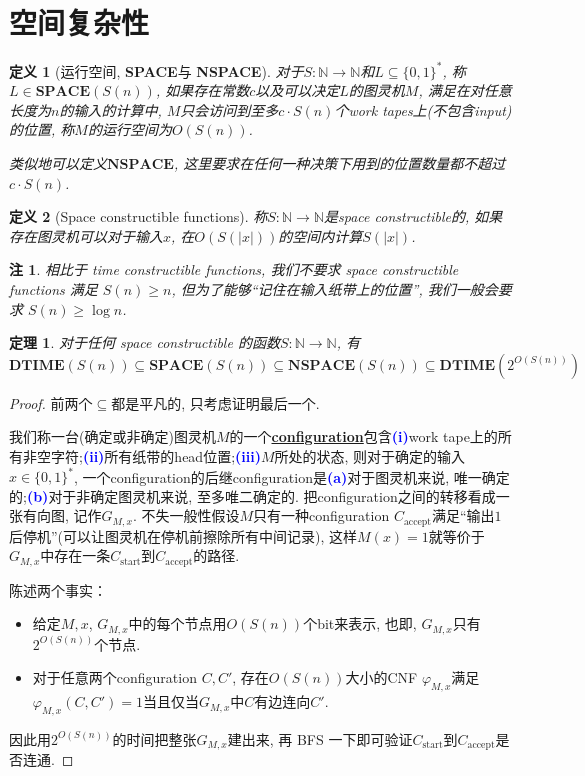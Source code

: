 \documentclass[8pt]{article}
\theoremstyle{compact}
\newtheorem{theorem}{定理}
\newtheorem{definition}{定义}
\newtheorem{remark}{注}
\def\obj#1{\textbf{\uline{#1}}}
\def\num#1{\textnormal{\textbf{\mbox{\textcolor{blue}{(#1)}}}}}
\def\ge{\geqslant}
\def\DTIME{\textbf{DTIME}}
\def\SPACE{\textbf{SPACE}}
\def\NSPACE{\textbf{NSPACE}}
\begin{document}
\section{空间复杂性}
\begin{definition}[运行空间, \SPACE 与 \NSPACE]
	对于$S: \mathbb N \to \mathbb N$和$L \subseteq \{0, 1\}^*$, 称$L \in \SPACE(S(n))$, 如果存在常数$c$以及可以决定$L$的图灵机$M$, 满足在对任意长度为$n$的输入的计算中, $M$只会访问到至多$c \cdot S(n)$个work tapes上(不包含input)的位置, 称$M$的运行空间为$O(S(n))$. 

	类似地可以定义$\NSPACE$, 这里要求在任何一种决策下用到的位置数量都不超过$c \cdot S(n)$. 
\end{definition}
\begin{definition}[Space constructible functions]
	称$S: \mathbb N \to \mathbb N$是space constructible的, 如果存在图灵机可以对于输入$x$, 在$O(S(|x|))$的空间内计算$S(|x|)$. 
\end{definition}
\begin{remark}
	相比于 time constructible functions, 我们不要求 space constructible functions 满足 $S(n) \ge n$, 但为了能够“记住在输入纸带上的位置”, 我们一般会要求 $S(n) \ge \log n$. 
\end{remark}
\begin{theorem}
	对于任何 space constructible 的函数$S: \mathbb N \to \mathbb N$, 有
	$$\DTIME(S(n)) \subseteq \SPACE(S(n)) \subseteq \NSPACE(S(n)) \subseteq \DTIME(2^{O(S(n))})$$
	\label{time_and_space}
\end{theorem}
\begin{proof}
	前两个$\subseteq$都是平凡的, 只考虑证明最后一个. 

	我们称一台(确定或非确定)图灵机$M$的一个\obj{configuration}包含\num{i}work tape上的所有非空字符;\num{ii}所有纸带的head位置;\num{iii}$M$所处的状态, 则对于确定的输入$x \in \{0, 1\}^*$, 一个configuration的后继configuration是\num{a}对于图灵机来说, 唯一确定的;\num{b}对于非确定图灵机来说, 至多唯二确定的. 把configuration之间的转移看成一张有向图, 记作$G_{M, x}$. 不失一般性假设$M$只有一种configuration $C_{\text{accept}}$满足“输出$1$后停机”(可以让图灵机在停机前擦除所有中间记录), 这样$M(x) = 1$就等价于$G_{M, x}$中存在一条$C_{\text{start}}$到$C_{\text{accept}}$的路径. 

	陈述两个事实：
	\begin{itemize}
		\item 给定$M, x$, $G_{M, x}$中的每个节点用$O(S(n))$个bit来表示, 也即, $G_{M, x}$只有$2^{O(S(n))}$个节点. 
		\item 对于任意两个configuration $C, C'$, 存在$O(S(n))$大小的CNF $\varphi_{M, x}$满足$\varphi_{M, x}(C, C') = 1$当且仅当$G_{M, x}$中$C$有边连向$C'$. 
	\end{itemize}

	因此用$2^{O(S(n))}$的时间把整张$G_{M, x}$建出来, 再 BFS 一下即可验证$C_{\text{start}}$到$C_{\text{accept}}$是否连通. 
\end{proof}
\end{document}
